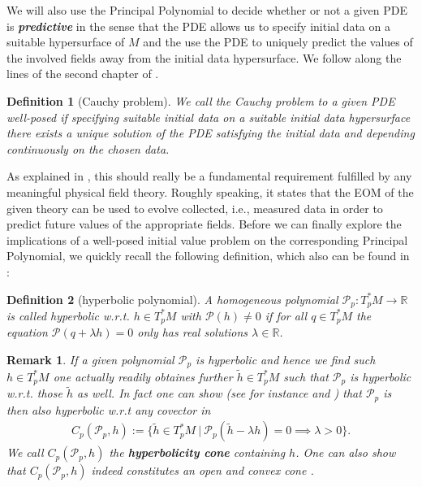 \documentclass[a4paper,12pt, DIV=14, BCOR=5mm, twoside, headsepline, numbers=noenddot]{scrbook}
\newtheorem{definition}{Definition}[section]
\newtheorem*{remark}{Remark}
\begin{document}
We will also use the Principal Polynomial to decide whether or not a given PDE is \textit{\textbf{predictive}} in the sense that the PDE allows us to specify initial data on a suitable hypersurface of $M$ and the use the PDE to uniquely predict the values of the involved fields away from the initial data hypersurface. We follow along the lines of the second chapter of \cite{Rivera}.
\begin{definition}[Cauchy problem]
We call the Cauchy problem to a given PDE well-posed if specifying suitable initial data on a suitable initial data hypersurface there exists a unique solution of the PDE satisfying the initial data and depending continuously on the chosen data.  
\end{definition}
As explained in \cite{Rivera}, this should really be a fundamental requirement fulfilled by any meaningful physical field theory. Roughly speaking, it states that the EOM of the given theory can be used to evolve collected, i.e., measured data in order to predict future values of the appropriate fields.
Before we can finally explore the implications of a well-posed initial value problem on the corresponding Principal Polynomial, we quickly recall the following definition, which also can be found in \cite{Rivera}:
\begin{definition}[hyperbolic polynomial]
A homogeneous polynomial $\mathcal{P}_p : T_p^{\ast}M \rightarrow \mathbb{R}$ is called hyperbolic w.r.t. $h\in T_p^{\ast}M$ with $\mathcal{P}(h) \neq 0$ if for all $q\in T_p^{\ast}M$ the equation $\mathcal{P}(q + \lambda h)=0$ only has real solutions $\lambda \in \mathbb{R}$.
\end{definition}
\begin{remark}
If a given polynomial $\mathcal{P}_p$ is hyperbolic and hence we find such $h\in T^{\ast}_pM$ one actually readily obtaines further $\tilde{h}\in T^{\ast}_pM$ such that $\mathcal{P}_p$ is hyperbolic w.r.t. those $\tilde{h}$ as well. In fact one can show (see for instance \cite{Rivera} and \cite{10.2307/24900665}) that $\mathcal{P}_p$ is then also hyperbolic w.r.t any covector in 
\begin{align}
    C_p(\mathcal{P}_p,h) := \{ \tilde{h} \in T_p^{\ast}M \ \vert \ \mathcal{P}_p(\tilde{h}- \lambda h) = 0 \implies \lambda > 0\}.
\end{align}
We call $C_p(\mathcal{P}_p,h)$ the \textbf{\textit{hyperbolicity cone}} containing $h$. One can also show that $C_p(\mathcal{P}_p,h)$ indeed constitutes an open and convex cone \cite{10.2307/24900665}.
\end{remark}
\end{document}
